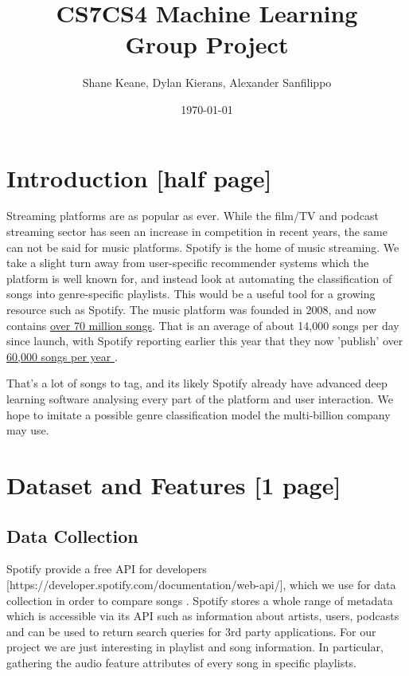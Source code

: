 \documentclass[10pt, a4]{article} %
\title{ CS7CS4 Machine Learning\\Group Project}
\author{Shane Keane, Dylan Kierans, Alexander Sanfilippo}
\date{\today}
\begin{document}
\maketitle{}

\section*{Introduction [half page]}
Streaming platforms are as popular as ever. While the film/TV and podcast streaming sector has seen an increase in competition in recent years, the same can not be said for music platforms. Spotify is the home of music streaming. We take a slight turn away from user-specific recommender systems which the platform is well known for, and instead look at automating the classification of songs into genre-specific playlists. This would be a useful tool for a growing resource such as Spotify. The music platform was founded in 2008, and now contains \href{https://newsroom.spotify.com/company-info/}{over 70 million songs}. That is an average of about 14,000 songs per day since launch, with Spotify reporting earlier this year that they now 'publish' over \href{https://www.youtube.com/watch?v=Vvo-2MrSgFE&ab_channel=Spotify}{60,000 songs per year }. \newline

That's a lot of songs to tag, and its likely Spotify already have advanced deep learning software analysing every part of the platform and user interaction. We hope to imitate a possible genre classification model the multi-billion company may use.


\section*{Dataset and Features [1 page]}
\subsection*{Data Collection}

Spotify provide a free API for developers [https://developer.spotify.com/documentation/web-api/], which we use for data collection in order to compare songs . Spotify stores a whole range of metadata which is accessible via its API such as information about artists, users, podcasts and can be used to return search queries for 3rd party applications. For our project we are just interesting in playlist and song information. In particular, gathering the audio feature attributes of every song in specific playlists.
\end{document}
